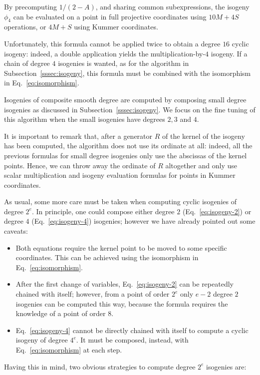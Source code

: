 \documentclass[jmc]{degruyter-journal-a}
\theoremstyle{definition}
\begin{document}
By precomputing $1/(2-A)$, and sharing common subexpressions, the
isogeny $\phi_4$ can be evaluated on a point in full projective
coordinates using $10M+4S$ operations, or $4M+S$ using Kummer
coordinates.

Unfortunately, this formula cannot be applied twice to obtain a degree
$16$ cyclic isogeny: indeed, a double application yields the
multiplication-by-$4$ isogeny. If a chain of degree $4$ isogenies is
wanted, as for the algorithm in Subsection~\ref{sssec:isogeny}, this
formula must be combined with the isomorphism in
Eq.~\eqref{eq:isomorphism}.

Isogenies of composite smooth degree are computed by composing small
degree isogenies as discussed in Subsection~\ref{sssec:isogeny}. We
focus on the fine tuning of this algorithm when the small isogenies
have degrees $2,3$ and $4$.

It is important to remark that, after a generator $R$ of the kernel of
the isogeny has been computed, the algorithm does not use its ordinate
at all: indeed, all the previous formulas for small degree isogenies
only use the abscissas of the kernel points. Hence, we can throw away
the ordinate of $R$ altogether and only use scalar multiplication and
isogeny evaluation formulas for points in Kummer
coordinates.

As usual, some more care must be taken when computing cyclic isogenies
of degree $2^e$. In principle, one could compose either degree $2$
(Eq.~\ref{eq:isogeny-2}) or degree $4$ (Eq.~\ref{eq:isogeny-4})
isogenies; however we have already pointed out some caveats:

\begin{itemize}
\item Both equations require the kernel point to be moved to some
  specific coordinates. This can be achieved using the isomorphism in
  Eq.~\eqref{eq:isomorphism}.
\item After the first change of variables, Eq.~\eqref{eq:isogeny-2}
  can be repeatedly chained with itself; however, from a point of
  order $2^e$ only $e-2$ degree $2$ isogenies can be computed this
  way, because the formula requires the knowledge of a point of order $8$.
\item Eq.~\eqref{eq:isogeny-4} cannot be directly chained with itself
  to compute a cyclic isogeny of degree $4^e$. It must be composed,
  instead, with Eq.~\eqref{eq:isomorphism} at each step.
\end{itemize}

Having this in mind, two obvious strategies to compute degree $2^e$
isogenies are:
\end{document}
